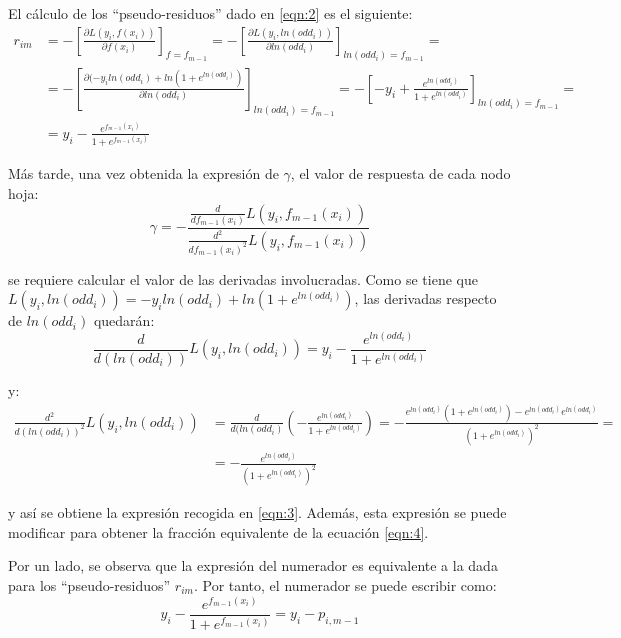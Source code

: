 \documentclass[12pt,twoside]{article}
\begin{document}
El cálculo de los ``pseudo-residuos'' dado en \ref{eqn:2} es el siguiente:
\begin{equation*}
\begin{split}
r_{im} &= -\left[ \frac{\partial L(y_i, f(x_i))}{\partial f(x_i)} \right]_{f=f_{m-1}} = - \left[ \frac{\partial L(y_i, ln(odd_i))}{\partial ln(odd_i)} \right]_{ln(odd_i)=f_{m-1}} = \\
& = - \left[ \frac{\partial (-y_iln(odd_i) + ln(1+e^{ln(odd_i)})}{\partial ln(odd_i)} \right]_{ln(odd_i)=f_{m-1}} = - \left[ - y_i + \frac{e^{ln(odd_i)}}{1 + e^{ln(odd_i)}} \right]_{ln(odd_i) = f_{m-1}} =  \\
& = y_i - \frac{e^{f_{m-1}(x_i)}}{1 + e^{f_{m-1}(x_i)}}
\end{split}
\end{equation*}

Más tarde, una vez obtenida la expresión de $\gamma$, el valor de respuesta de cada nodo hoja:
\begin{equation*}
\gamma = - \frac{\frac{d}{df_{m-1}(x_i)}L(y_i, f_{m-1}(x_i))}{\frac{d^2}{df_{m-1}(x_i)^2}L(y_i, f_{m-1}(x_i))}
\end{equation*}

\noindent
se requiere calcular el valor de las derivadas involucradas. Como se tiene que $L(y_i, ln(odd_i)) = -y_iln(odd_i) + ln(1 + e^{ln(odd_i)})$, las derivadas respecto de $ln(odd_i)$ quedarán:
\begin{equation*}
\frac{d}{d(ln(odd_i))}L(y_i, ln(odd_i)) = y_i - \frac{e^{ln(odd_i)}}{1 + e^{ln(odd_i)}}
\end{equation*}

\noindent
y:
\begin{equation*}
\begin{split}
\frac{d^2}{d(ln(odd_i))^2}L(y_i, ln(odd_i)) &=\frac{d}{d(ln(odd_i)} \left( - \frac{e^{ln(odd_i)}}{1 + e^{ln(odd_i)}} \right) = - \frac{e^{ln(odd_i)}(1 + e^{ln(odd_i)}) - e^{ln(odd_i)}e^{ln(odd_i)}}{(1 + e^{ln(odd_i)})^2} = \\
&= - \frac{e^{ln(odd_i)}}{(1 + e^{ln(odd_i)})^2}
\end{split}
\end{equation*}

\noindent
y así se obtiene la expresión recogida en \ref{eqn:3}. Además, esta expresión se puede modificar para obtener la fracción equivalente de la ecuación \ref{eqn:4}.

Por un lado, se observa que la expresión del numerador es equivalente a la dada para los ``pseudo-residuos'' $r_{im}$. Por tanto, el numerador se puede escribir como:
\begin{equation*}
y_i - \frac{e^{f_{m-1}(x_i)}}{1 + e^{f_{m-1}(x_i)}} = y_i - p_{i, m-1}
\end{equation*}
\end{document}
